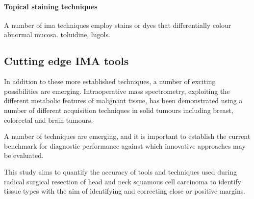 \paragraph{Topical staining techniques}
A number of \gls{ima} techniques employ stains or dyes that differentially colour abnormal mucosa.
toluidine, lugols.


\subsection{Cutting edge IMA tools}
In addition to these more established techniques, a number of exciting possibilities are emerging. 
Intraoperative mass spectrometry, exploiting the different metabolic features of malignant tissue, has been demonstrated using a number of different acquisition techniques in solid tumours including breast, colorectal and brain tumours.

A number of techniques are emerging, and it is important to establish the current benchmark for diagnostic performance against which innovative approaches may be evaluated.

This study aims to quantify the accuracy of tools and techniques used during radical surgical resection of head and neck squamous cell carcinoma to identify tissue types with the aim of identifying and correcting close or positive margins.

